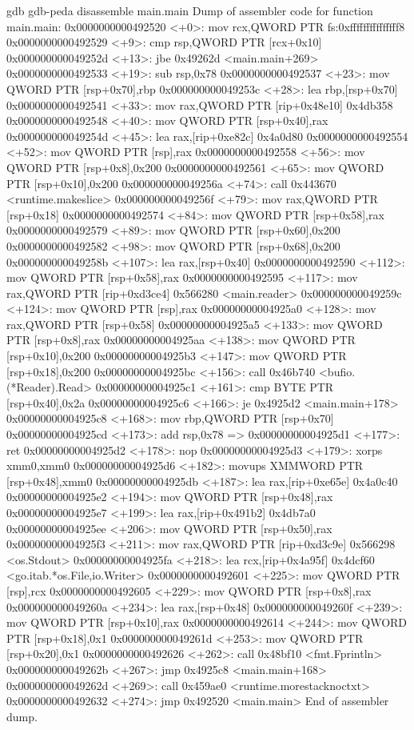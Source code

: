     gdb
    gdb-peda disassemble main.main
    Dump of assembler code for function main.main:
    0x0000000000492520 <+0>:	mov    rcx,QWORD PTR fs:0xfffffffffffffff8
    0x0000000000492529 <+9>:	cmp    rsp,QWORD PTR [rcx+0x10]
    0x000000000049252d <+13>:	jbe    0x49262d <main.main+269>
    0x0000000000492533 <+19>:	sub    rsp,0x78
    0x0000000000492537 <+23>:	mov    QWORD PTR [rsp+0x70],rbp
    0x000000000049253c <+28>:	lea    rbp,[rsp+0x70]
    0x0000000000492541 <+33>:	mov    rax,QWORD PTR [rip+0x48e10]         0x4db358
    0x0000000000492548 <+40>:	mov    QWORD PTR [rsp+0x40],rax
    0x000000000049254d <+45>:	lea    rax,[rip+0xe82c]         0x4a0d80
    0x0000000000492554 <+52>:	mov    QWORD PTR [rsp],rax
    0x0000000000492558 <+56>:	mov    QWORD PTR [rsp+0x8],0x200
    0x0000000000492561 <+65>:	mov    QWORD PTR [rsp+0x10],0x200
    0x000000000049256a <+74>:	call   0x443670 <runtime.makeslice>
    0x000000000049256f <+79>:	mov    rax,QWORD PTR [rsp+0x18]
    0x0000000000492574 <+84>:	mov    QWORD PTR [rsp+0x58],rax
    0x0000000000492579 <+89>:	mov    QWORD PTR [rsp+0x60],0x200
    0x0000000000492582 <+98>:	mov    QWORD PTR [rsp+0x68],0x200
    0x000000000049258b <+107>:	lea    rax,[rsp+0x40]
    0x0000000000492590 <+112>:	mov    QWORD PTR [rsp+0x58],rax
    0x0000000000492595 <+117>:	mov    rax,QWORD PTR [rip+0xd3ce4]         0x566280 <main.reader>
    0x000000000049259c <+124>:	mov    QWORD PTR [rsp],rax
    0x00000000004925a0 <+128>:	mov    rax,QWORD PTR [rsp+0x58]
    0x00000000004925a5 <+133>:	mov    QWORD PTR [rsp+0x8],rax
    0x00000000004925aa <+138>:	mov    QWORD PTR [rsp+0x10],0x200
    0x00000000004925b3 <+147>:	mov    QWORD PTR [rsp+0x18],0x200
    0x00000000004925bc <+156>:	call   0x46b740 <bufio.(*Reader).Read>
    0x00000000004925c1 <+161>:	cmp    BYTE PTR [rsp+0x40],0x2a
    0x00000000004925c6 <+166>:	je     0x4925d2 <main.main+178>
    0x00000000004925c8 <+168>:	mov    rbp,QWORD PTR [rsp+0x70]
    0x00000000004925cd <+173>:	add    rsp,0x78
    => 0x00000000004925d1 <+177>:	ret
    0x00000000004925d2 <+178>:	nop
    0x00000000004925d3 <+179>:	xorps  xmm0,xmm0
    0x00000000004925d6 <+182>:	movups XMMWORD PTR [rsp+0x48],xmm0
    0x00000000004925db <+187>:	lea    rax,[rip+0xe65e]         0x4a0c40
    0x00000000004925e2 <+194>:	mov    QWORD PTR [rsp+0x48],rax
    0x00000000004925e7 <+199>:	lea    rax,[rip+0x491b2]         0x4db7a0
    0x00000000004925ee <+206>:	mov    QWORD PTR [rsp+0x50],rax
    0x00000000004925f3 <+211>:	mov    rax,QWORD PTR [rip+0xd3c9e]         0x566298 <os.Stdout>
    0x00000000004925fa <+218>:	lea    rcx,[rip+0x4a95f]         0x4dcf60 <go.itab.*os.File,io.Writer>
    0x0000000000492601 <+225>:	mov    QWORD PTR [rsp],rcx
    0x0000000000492605 <+229>:	mov    QWORD PTR [rsp+0x8],rax
    0x000000000049260a <+234>:	lea    rax,[rsp+0x48]
    0x000000000049260f <+239>:	mov    QWORD PTR [rsp+0x10],rax
    0x0000000000492614 <+244>:	mov    QWORD PTR [rsp+0x18],0x1
    0x000000000049261d <+253>:	mov    QWORD PTR [rsp+0x20],0x1
    0x0000000000492626 <+262>:	call   0x48bf10 <fmt.Fprintln>
    0x000000000049262b <+267>:	jmp    0x4925c8 <main.main+168>
    0x000000000049262d <+269>:	call   0x459ae0 <runtime.morestacknoctxt>
    0x0000000000492632 <+274>:	jmp    0x492520 <main.main>
    End of assembler dump.


